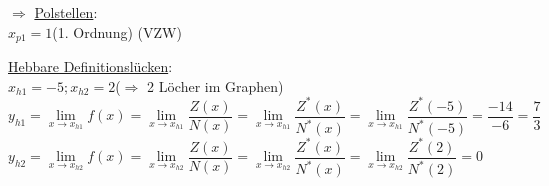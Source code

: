 \begin{enumerate}
	$\Rightarrow$ \ul{Polstellen}:\\
	$x_{p1} = 1$\quad(1. Ordnung) (VZW)
	
	\ul{Hebbare Definitionslücken}:\\
	$x_{h1} = -5;x_{h2} = 2$\quad($\Rightarrow$ 2 Löcher im Graphen)\\
	$y_{h1} = \lim\limits_{x\to x_{h1}}f(x) = \lim\limits_{x\to x_{h1}}\dfrac{Z(x)}{N(x)} = \lim\limits_{x\to x_{h1}}\dfrac{Z^*(x)}{N^*(x)} = \lim\limits_{x\to x_{h1}}\dfrac{Z^*(-5)}{N^*(-5)} = \dfrac{-14}{-6} = \dfrac{7}{3}$\\
	$y_{h2} = \lim\limits_{x\to x_{h2}}f(x) = \lim\limits_{x\to x_{h2}}\dfrac{Z(x)}{N(x)} = \lim\limits_{x\to x_{h2}}\dfrac{Z^*(x)}{N^*(x)} = \lim\limits_{x\to x_{h2}}\dfrac{Z^*(2)}{N^*(2)} = 0$\\
	
\end{enumerate}

\clearpage

